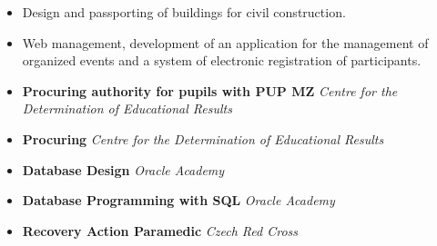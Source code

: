\documentclass[10pt,a4paper,ragged2e]{altacv}
\begin{document}
\divider

\begin{itemize}
\item Design and passporting of buildings for civil construction.
\end{itemize}

\divider

\begin{itemize}
\item Web management, development of an application for the management of organized events and a system of electronic registration of participants.
\end{itemize}


\smallskip
\begin{itemize}
\smallskip
\item \textbf{Procuring authority for pupils with PUP MZ} \textit{Centre for the Determination of Educational Results}
\smallskip
\item \textbf{Procuring} \textit{Centre for the Determination of Educational Results}
\smallskip
\item \textbf{Database Design} \textit{Oracle Academy}
\smallskip
\item \textbf{Database Programming with SQL} \textit{Oracle Academy}
\smallskip
\item \textbf{Recovery Action Paramedic} \textit{Czech Red Cross}
\end{itemize}




\clearpage


\nocite{*}






\end{document}
